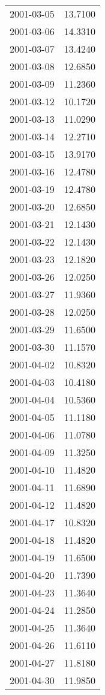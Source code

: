\begin{tabular}{lr}
2001-03-05 &     13.7100 \\
2001-03-06 &     14.3310 \\
2001-03-07 &     13.4240 \\
2001-03-08 &     12.6850 \\
2001-03-09 &     11.2360 \\
2001-03-12 &     10.1720 \\
2001-03-13 &     11.0290 \\
2001-03-14 &     12.2710 \\
2001-03-15 &     13.9170 \\
2001-03-16 &     12.4780 \\
2001-03-19 &     12.4780 \\
2001-03-20 &     12.6850 \\
2001-03-21 &     12.1430 \\
2001-03-22 &     12.1430 \\
2001-03-23 &     12.1820 \\
2001-03-26 &     12.0250 \\
2001-03-27 &     11.9360 \\
2001-03-28 &     12.0250 \\
2001-03-29 &     11.6500 \\
2001-03-30 &     11.1570 \\
2001-04-02 &     10.8320 \\
2001-04-03 &     10.4180 \\
2001-04-04 &     10.5360 \\
2001-04-05 &     11.1180 \\
2001-04-06 &     11.0780 \\
2001-04-09 &     11.3250 \\
2001-04-10 &     11.4820 \\
2001-04-11 &     11.6890 \\
2001-04-12 &     11.4820 \\
2001-04-17 &     10.8320 \\
2001-04-18 &     11.4820 \\
2001-04-19 &     11.6500 \\
2001-04-20 &     11.7390 \\
2001-04-23 &     11.3640 \\
2001-04-24 &     11.2850 \\
2001-04-25 &     11.3640 \\
2001-04-26 &     11.6110 \\
2001-04-27 &     11.8180 \\
2001-04-30 &     11.9850 \\

\end{tabular}
